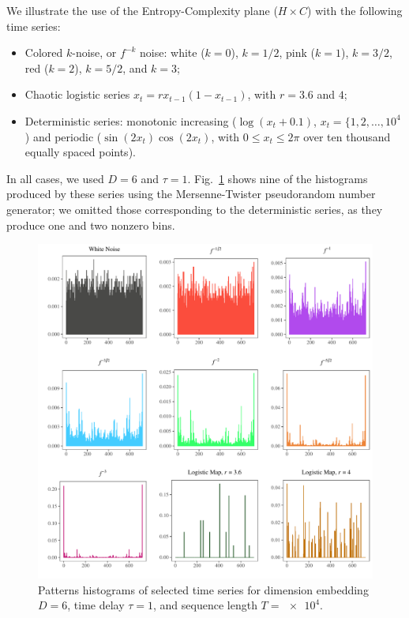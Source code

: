 We illustrate the use of the Entropy-Complexity plane ($H\times C$) with the following time series:
\begin{itemize}
	\item Colored $k$-noise, or $f^{-k}$ noise: white ($k=0$), $k=1/2$, pink ($k=1$), $k=3/2$, red ($k=2$), $k=5/2$, and $k=3$;
	\item Chaotic logistic series $x_t = r x_{t-1} (1 - x_{t-1})$, with $r=3.6$ and $4$;
	\item Deterministic series: monotonic increasing ($\log(x_t+0.1)$, $x_t=\{1,2,\dots,10^4$) and periodic ($\sin(2x_t)\cos(2x_t)$, with $0\leq x_t\leq 2\pi$ over ten thousand equally spaced points).
\end{itemize}
In all cases, we used $D=6$ and $\tau=1$.
Fig.~\ref{fig:Histograms} shows nine of the histograms produced by these series using the Mersenne-Twister pseudorandom number generator;
we omitted those corresponding to the deterministic series, as they produce one and two nonzero bins.

\begin{figure}[hbt]
	\includegraphics[width=\linewidth]{Figures/h.pdf}
	\caption{Patterns histograms of selected time series  for dimension embedding $D = 6$, time delay $\tau = 1$, and sequence length $T = \num[scientific-notation=true]{e4}$.}
	\label{fig:Histograms}
\end{figure}


